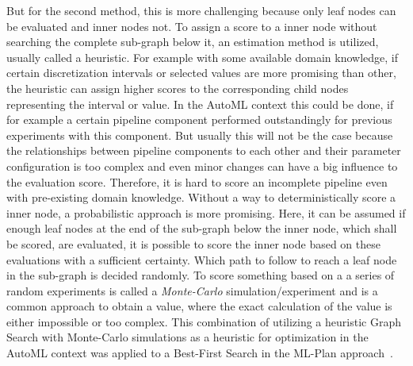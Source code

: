But for the second method, this is more challenging because only leaf nodes can be evaluated and inner nodes not.
To assign a score to a inner node without searching the complete sub-graph below it, an estimation method is utilized, usually called a heuristic.\newline
For example with some available domain knowledge, if certain discretization intervals or selected values are more promising than other, the heuristic can assign higher scores to the corresponding child nodes representing the interval or value.
In the AutoML context this could be done, if for example a certain pipeline component performed outstandingly for previous experiments with this component.
But usually this will not be the case because the relationships between pipeline components to each other and their parameter configuration is too complex and even minor changes can have a big influence to the evaluation score.
Therefore, it is hard to score an incomplete pipeline even with pre-existing domain knowledge.\newline
Without a way to deterministically score a inner node, a probabilistic approach is more promising.
Here, it can be assumed if enough leaf nodes at the end of the sub-graph below the inner node, which shall be scored, are evaluated, it is possible to score the inner node based on these evaluations with a sufficient certainty.
Which path to follow to reach a leaf node in the sub-graph is decided randomly.
To score something based on a a series of random experiments is called a \textit{Monte-Carlo} simulation/experiment and is a common approach to obtain a value, where the exact calculation of the value is either impossible or too complex.
This combination of utilizing a heuristic Graph Search with Monte-Carlo simulations as a heuristic for optimization in the AutoML context was applied to a Best-First Search in the ML-Plan approach~\cite{Mohr-ML-Plan}. 

